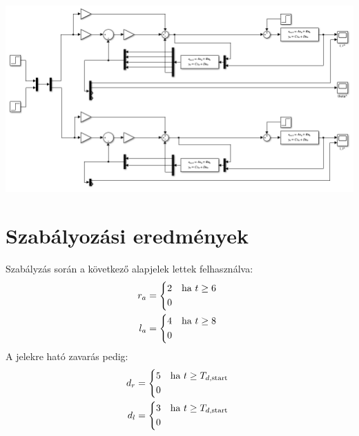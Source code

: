 \documentclass{article}
\begin{document}
    \begin{minipage}{\linewidth}
        \includegraphics[width=\linewidth]{asset/rl.png}
    \end{minipage}

\section{Szabályozási eredmények}
    Szabályzás során a következő alapjelek lettek felhasználva:
    \begin{align}
        r_a & =
        \begin{cases*}
            2 & ha $t \geq 6$ \\
            0   & 
        \end{cases*} \\
        l_a & =
        \begin{cases*}
            4 & ha $t \geq 8$ \\
            0   & 
        \end{cases*}
    \end{align}
    A jelekre ható zavarás pedig:
    \begin{align}
        d_r & =
        \begin{cases*}
            5 & ha $t \geq T_{d,\textrm{start}}$ \\
            0   & 
        \end{cases*} \\
        d_l & =
        \begin{cases*}
            3 & ha $t \geq T_{d,\textrm{start}}$ \\
            0   & 
        \end{cases*}
    \end{align}
\end{document}
